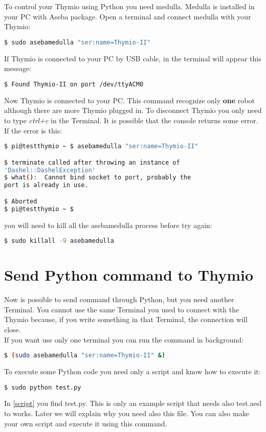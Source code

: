 \documentclass[12pt]{article}%
\begin{document}
	To control your Thymio using Python you need medulla.
	Medulla is installed in your PC with Aseba package.
	Open a terminal and connect medulla with your Thymio:
	\begin{lstlisting}[language=bash]
$ sudo asebamedulla "ser:name=Thymio-II"
	\end{lstlisting}

	If Thymio is connected to your PC by USB cable, in the terminal will appear this message:
	\begin{lstlisting}[language=bash]
$ Found Thymio-II on port /dev/ttyACM0
	\end{lstlisting}
	
	Now Thymio is connected to your PC. This command recognize only \textbf{one} robot although there are more Thymio plugged in.
	To disconnect Thymio you only need to type \textit{ctrl+c} in the Terminal. 
	It is possible that the console returns some error. 
	If the error is this:
	\begin{lstlisting}[language=bash]
$ pi@testthymio ~ $ asebamedulla "ser:name=Thymio-II"

$ terminate called after throwing an instance of 
'Dashel::DashelException'
$ what():  Cannot bind socket to port, probably the 
port is already in use. 

$ Aborted 
$ pi@testthymio ~ $
	\end{lstlisting}
	you will need to kill all the asebamedulla process before try again:
	\begin{lstlisting}[language=bash]
$ sudo killall -9 asebamedulla
	\end{lstlisting}
	
\section{Send Python command to Thymio}
	Now is possible to send command through Python, but you need another Terminal. 
	You cannot use the same Terminal you used to connect with the Thymio because, if you write something in that Terminal, the connection will close.\\
	If you want use only one terminal you can run the command in background:
	\begin{lstlisting}[language=bash]
$ (sudo asebamedulla "ser:name=Thymio-II" &)
	\end{lstlisting}
	
	To execute some Python code you need only a script and know how to execute it:
	\begin{lstlisting}[language=bash]
$ sudo python test.py
	\end{lstlisting}
	In \ref{script} you find test.py. This is only an example script that needs also test.aesl to works. Later we will explain why you need also this file. You can also make your own script and execute it using this command.\\ 
	
\end{document}
